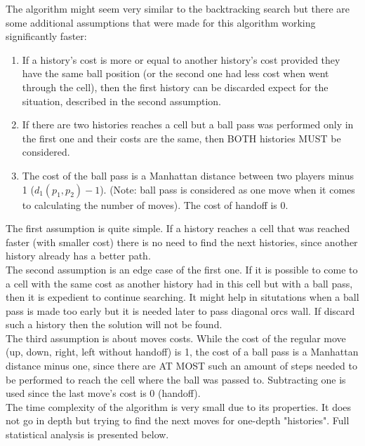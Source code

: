 \documentclass{article}
\begin{document}
The algorithm might seem very similar to the backtracking search but there are some additional assumptions that were made for this algorithm working significantly faster:
\begin{enumerate}
	\item If a history's cost is more or equal to another history's cost provided they have the same ball position (or the second one had less cost when went through the cell), then the first history can be discarded expect for the situation, described in the second assumption.
	\item If there are two histories reaches a cell but a ball pass was performed only in the first one and their costs are the same, then BOTH histories MUST be considered.
	\item The cost of the ball pass is a Manhattan distance between two players minus 1 ($d_1(p_1, p_2) - 1$). (Note: ball pass is considered as one move when it comes to calculating the number of moves). The cost of handoff is 0.
\end{enumerate}
The first assumption is quite simple. If a history reaches a cell that was reached faster (with smaller cost) there is no need to find the next histories, since another history already has a better path.\\
The second assumption is an edge case of the first one. If it is possible to come to a cell with the same cost as another history had in this cell but with a ball pass, then it is expedient to continue searching. It might help in situtations when a ball pass is made too early but it is needed later to pass diagonal orcs wall. If discard such a history then the solution will not be found.\\
The third assumption is about moves costs. While the cost of the regular move (up, down, right, left without handoff) is 1, the cost of a ball pass is a Manhattan distance minus one, since there are AT MOST such an amount of steps needed to be performed to reach the cell where the ball was passed to. Subtracting one is used since the last move's cost is 0 (handoff).\\
The time complexity of the algorithm is very small due to its properties. It does not go in depth but trying to find the next moves for one-depth "histories". Full statistical analysis is presented below.
\end{document}
